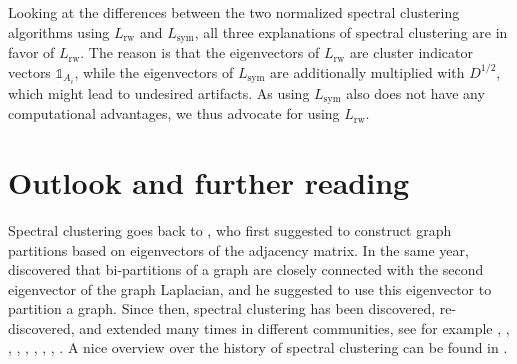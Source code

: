 \documentclass{article}
\newcommand{\charfct}{\mathbb{1}}
\newcommand{\Lsym}{L_{\text{sym}}}
\newcommand{\Lrw}{L_{\text{rw}}}
\begin{document}
Looking at the differences between the two normalized spectral
clustering algorithms using $\Lrw$ and $\Lsym$, all three explanations
of spectral clustering are in favor of $\Lrw$.  The reason is that the
eigenvectors of $\Lrw$ are cluster indicator vectors $\charfct_{A_i}$,
while the eigenvectors of $\Lsym$ are additionally multiplied with
$D^{1/2 }$, which might lead to undesired artifacts. %
As using $\Lsym$ also
does not have any computational advantages, we thus advocate for using
$\Lrw$. \\


%
\section{Outlook and further reading} \label{sec-extensions}
%


Spectral clustering goes back to , who first suggested
to construct graph partitions based on eigenvectors of the adjacency
matrix. In the same year,  discovered that
bi-partitions of a graph are closely connected with the second
eigenvector of the graph Laplacian, and he suggested to use this
eigenvector to partition a graph. Since then, spectral clustering has
been discovered, re-discovered, and extended many times in different
communities, see for example 
%
,
,
,
,  %
,  %
,  %
,
,
. 
A nice overview over the history of spectral clustering can be found
in . \\
\end{document}

